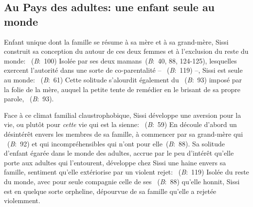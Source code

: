 \subsection{Au Pays des adultes: une enfant seule au monde}
Enfant unique dont la famille se résume à sa mère et à sa grand-mère, Sissi construit sa conception du  autour de ces deux femmes et à l'exclusion du reste du monde: ~(\textit{B}:~100)
Isolée par ses deux mamans~(\textit{B}:~40, 88, 124-125), lesquelles exercent l'autorité dans une sorte de co-parentalité -- ~(\textit{B}:~119) --, Sissi est seule au monde: ~(\textit{B}:~61)
Cette solitude s'alourdit également du ~(\textit{B}:~93) imposé par la folie de la mère, auquel la petite tente de remédier en le brisant de sa propre parole, ~(\textit{B}:~93).
\par
Face à ce climat familial claustrophobique, Sissi développe une aversion pour la vie, ou plutôt pour \textit{cette} vie qui est la sienne:
~(\textit{B}:~59)
En découle d'abord un désintérêt envers les membres de sa famille, à commencer par sa grand-mère qui ~(\textit{B}:~92) et qui  incompréhensibles qui n'ont  pour elle~(\textit{B}:~88).
Sa solitude d'enfant égarée dans le monde des adultes, accrue par le peu d'intérêt qu'elle porte aux adultes qui l'entourent, développe chez Sissi une haine envers sa famille, sentiment qu'elle extériorise par un violent rejet: ~(\textit{B}:~119)
Isolée du reste du monde, avec pour seule compagnie celle de ses ~(\textit{B}:~88) qu'elle honnit, Sissi est en quelque sorte orpheline, dépourvue de sa famille qu'elle a rejetée violemment.

